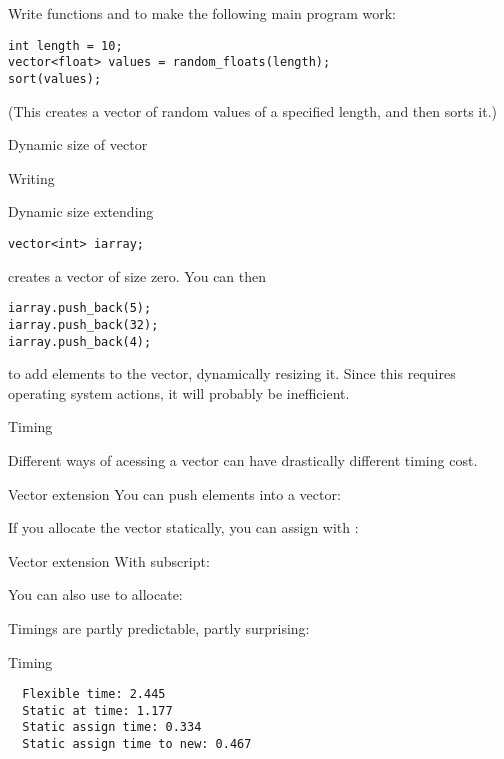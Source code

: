 \begin{exercise}
  \label{ex:vec-rand-sort}
  Write functions  and  to make the following
  main program work:
\begin{verbatim}
int length = 10;
vector<float> values = random_floats(length);
sort(values);
\end{verbatim}
  (This creates a vector of random values of a specified length, and
then sorts it.)
\end{exercise}

 {Dynamic size of vector}

Writing

\begin{block}{Dynamic size extending}
  \label{sl:vector-extend}
\begin{verbatim}
vector<int> iarray;
\end{verbatim}
creates a vector of size zero. You can then
\begin{verbatim}
iarray.push_back(5);
iarray.push_back(32);
iarray.push_back(4);
\end{verbatim}
\end{block}

to add elements to the vector, dynamically resizing it. Since this
requires operating system actions, it will probably be inefficient.

 {Timing}

Different ways of acessing a vector can have drastically different
timing cost.

\begin{block}{Vector extension}
  \label{sl:vect-extend-code}
  You can push elements into a vector:

  If you allocate the vector statically, you can assign with :
\end{block}

\begin{block}{Vector extension}
  \label{sl:vect-extend-code2}
  With subscript:

  You can also use  to allocate:
\end{block}

Timings are partly predictable, partly surprising:
\begin{block}{Timing}
  \label{sl:vector-extend-time}
\begin{verbatim}
  Flexible time: 2.445
  Static at time: 1.177
  Static assign time: 0.334
  Static assign time to new: 0.467
\end{verbatim}
\end{block}

